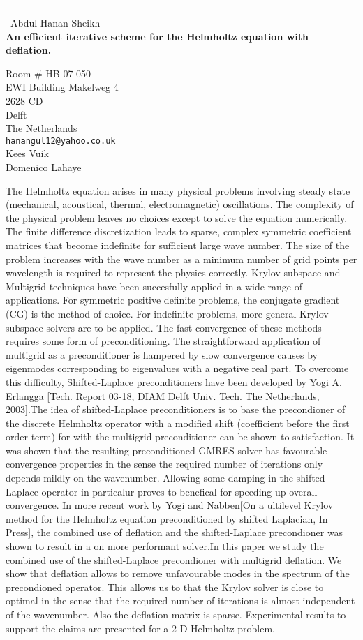 \documentclass{report}
\begin{document}
\begin{center}
\rule{6in}{1pt} \
{\large Abdul Hanan Sheikh \\
{\bf An efficient iterative scheme for the Helmholtz equation with deflation.}}

Room # HB 07 050 \\ EWI Building Makelweg 4 \\ 2628 CD \\ Delft \\ The Netherlands
\\
{\tt hanangul12@yahoo.co.uk}\\
Kees Vuik\\
Domenico Lahaye\end{center}

The Helmholtz equation arises in many physical problems involving steady
state (mechanical, acoustical, thermal, electromagnetic) oscillations.
The complexity of the physical problem leaves no choices except to solve
the equation numerically. The finite difference discretization leads to
sparse, complex symmetric coefficient matrices that become indefinite for
sufficient large wave number. The size of the problem increases with the
wave number as a minimum number of grid points per wavelength is required
to represent the physics correctly. Krylov subspace and Multigrid
techniques have been succesfully applied in a wide range of applications.
For symmetric positive definite problems, the conjugate gradient (CG) is
the method of choice. For indefinite problems, more general Krylov
subspace solvers are to be applied. The fast convergence of these methods
requires some form of preconditioning. The straightforward application of
multigrid as a preconditioner is hampered by slow convergence causes by
eigenmodes corresponding to eigenvalues with a negative real part. To
overcome this difficulty, Shifted-Laplace preconditioners have been
developed by Yogi A. Erlangga [Tech. Report 03-18, DIAM Delft Univ. Tech.
The Netherlands, 2003].The idea of shifted-Laplace preconditioners is to
base the precondioner of the discrete Helmholtz operator with a modified
shift (coefficient before the first order term) for with the multigrid
preconditioner can be shown to satisfaction. It was shown that the
resulting preconditioned GMRES solver has favourable convergence
properties in the sense the required number of iterations only depends
mildly on the wavenumber. Allowing some damping in the shifted Laplace
operator in particalur proves to benefical for speeding up overall
convergence. In more recent work by Yogi and Nabben[On a ultilevel Krylov
method for the Helmholtz equation preconditioned by shifted Laplacian, In
Press], the combined use of deflation and the shifted-Laplace
precondioner was shown to result in a on more performant solver.In this
paper we study the combined use of the shifted-Laplace precondioner with
multigrid deflation. We show that deflation allows to remove unfavourable
modes in the spectrum of the precondioned operator. This allows us to
that the Krylov solver is close to optimal in the sense that the required
number of iterations is almost independent of the wavenumber. Also the
deflation matrix is sparse. Experimental results to support the claims
are presented for a 2-D Helmholtz problem.
\end{document}
